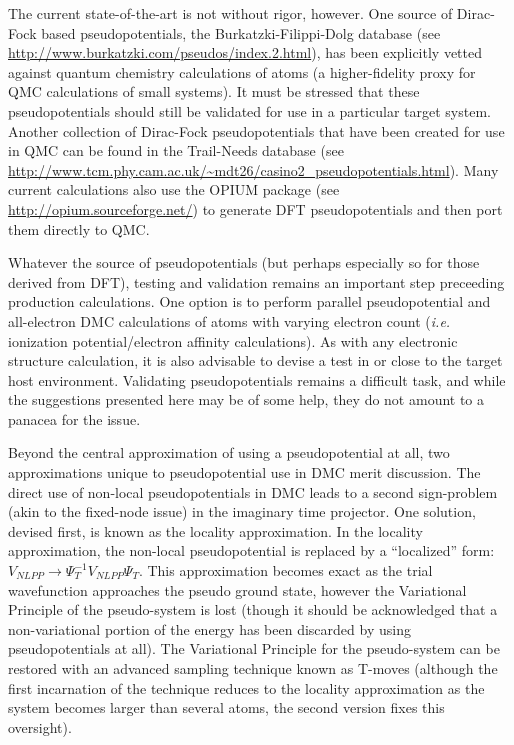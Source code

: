 \documentclass[oneside,11pt]{memoir}
\numberwithin{equation}{section}
\begin{document}
The current state-of-the-art is not without rigor, however.  One source of 
Dirac-Fock based pseudopotentials, the Burkatzki-Filippi-Dolg database (see 
\url{http://www.burkatzki.com/pseudos/index.2.html}), has been explicitly 
vetted against quantum chemistry calculations of atoms (a higher-fidelity 
proxy for QMC calculations of small systems).  It must be stressed that 
these pseudopotentials should still be validated for use in a particular 
target system.  Another collection of Dirac-Fock pseudopotentials that have 
been created for use in QMC can be found in the Trail-Needs database 
(see \url{http://www.tcm.phy.cam.ac.uk/~mdt26/casino2_pseudopotentials.html}). 
Many current calculations also use the OPIUM package (see 
\url{http://opium.sourceforge.net/}) to generate DFT pseudopotentials and then 
port them directly to QMC.

Whatever the source of pseudopotentials (but perhaps especially so for those 
derived from DFT), testing and validation remains an important step preceeding 
production calculations.  One option is to perform parallel pseudopotential 
and all-electron DMC calculations of atoms with varying electron count 
(\emph{i.e.} ionization potential/electron affinity calculations).  As with 
any electronic structure calculation, it is also advisable to devise a test 
in or close to the target host environment.
Validating pseudopotentials remains a difficult task, and while the suggestions 
presented here may be of some help, they do not amount to a panacea for the 
issue. 

Beyond the central approximation of using a pseudopotential at all, two 
approximations unique to pseudopotential use in DMC merit discussion.  The 
direct use of non-local pseudopotentials in DMC leads to a second sign-problem 
(akin to the fixed-node issue) in the imaginary time projector.  One solution, 
devised first, is known as the locality approximation.  In the locality 
approximation, the non-local pseudopotential is replaced by a ``localized'' 
form: $V_{NLPP}\rightarrow \Psi_T^{-1}V_{NLPP}\Psi_T$.  This approximation 
becomes exact as the trial wavefunction approaches the pseudo ground state, 
however the Variational Principle of the pseudo-system is lost (though it 
should be acknowledged that a non-variational portion of the energy has been 
discarded by using pseudopotentials at all).  The Variational Principle for 
the pseudo-system can be restored with an advanced sampling technique known 
as T-moves (although the first incarnation of the technique reduces to the 
locality approximation as the system becomes larger than several atoms, the 
second version fixes this oversight).
\end{document}

